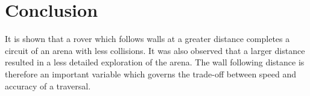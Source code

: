 \documentclass[a4paper,12pt,twocolumn]{article}
\begin{document}

\section{Conclusion}

It is shown that a rover which follows walls at a greater distance completes a circuit of an arena with less collisions. It was also observed that a larger distance resulted in a less detailed exploration of the arena. The wall following distance is therefore an important variable which governs the trade-off between speed and accuracy of a traversal.


\end{document}
